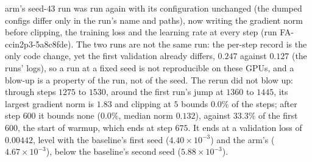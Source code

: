 \documentclass[11pt]{article}
\begin{document}
\begin{itemize}
    arm's seed-$43$ run was run again with its configuration unchanged (the dumped configs differ only in the run's
    name and paths), now writing the gradient norm before clipping, the training loss and the learning rate at every
    step (run FA-ccin2p3-5a8c8fde). The two runs are not the same run: the per-step record is the only code change,
    yet the first validation already differs, $0.247$ against $0.127$ (the runs' logs), so a run at a fixed seed is
    not reproducible on these GPUs, and a blow-up is a property of the run, not of the seed.
    The rerun did not blow up: through steps $1275$ to $1530$, around the first run's jump at $1360$ to $1445$, its
    largest gradient norm is $1.83$ and clipping at $5$ bounds $0.0\%$ of the steps; after step $600$ it bounds none
    ($0.0\%$, median norm $0.132$), against $33.3\%$ of the first $600$, the start of warmup, which ends at step $675$.
    It ends at a validation loss of $0.00442$, level with the baseline's first seed ($4.40\times10^{-3}$) and the arm's
    ($4.67\times10^{-3}$), below the baseline's second seed ($5.88\times10^{-3}$).

\end{itemize}
\end{document}

